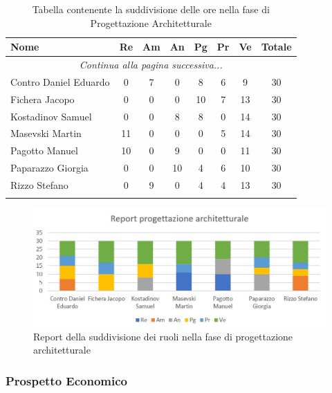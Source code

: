 \documentclass[../piano_di_progetto.tex]{subfiles}
\begin{document}
\begin{center}
	\begin{longtable}{|l|c|c|c|c|c|c|c|}
		\hline
		\rowcolor{lightgray}
		\textbf{Nome} & \textbf{Re} & \textbf{Am} & \textbf{An} & \textbf{Pg}  & \textbf{Pr}   & \textbf{Ve} & \textbf{Totale} \\
		\hline
		\endhead
		
		\hline
		\multicolumn{8}{|c|}{\emph{Continua alla pagina successiva...}}\\
		\hline
		\endfoot

		\endlastfoot
		
		\hline
			Contro Daniel Eduardo & 0 & 7 & 0 & 8 & 6 & 9 & 30\\
			Fichera Jacopo & 0 & 0 & 0 & 10 & 7 & 13 & 30 \\
			Kostadinov Samuel & 0 & 0 & 8 & 8 & 0 & 14 & 30 \\			
			Masevski Martin 	& 11 & 0 & 0 & 0 & 5 & 14 & 30\\
			Pagotto Manuel & 10 & 0 & 9 & 0 & 0 & 11 & 30 \\			
			Paparazzo Giorgia & 0 & 0 & 10 & 4 & 6 & 10 & 30 \\
			Rizzo Stefano & 0 & 9 & 0 & 4 & 4 & 13 & 30\\
		\hline	
		\rowcolor{white}
		\caption{Tabella contenente la suddivisione delle ore nella fase di Progettazione Architetturale}
	\end{longtable}
\end{center}

\begin{figure}[H]
\centering
\includegraphics[width=12cm]{componenti/img/report_prog_arc}
\caption{Report della suddivisione dei ruoli nella fase di progettazione architetturale}
\end{figure}

\subsubsection{Prospetto Economico}
\end{document}
